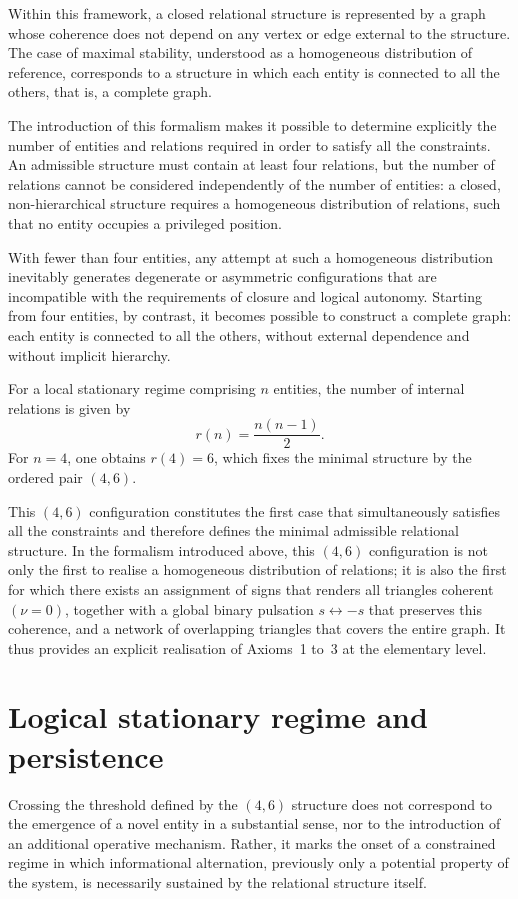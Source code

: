 \documentclass[11pt,a4paper]{article}
\begin{document}
Within this framework, a closed relational structure is represented by a graph whose coherence does not depend on any vertex or edge external to the structure. The case of maximal stability, understood as a homogeneous distribution of reference, corresponds to a structure in which each entity is connected to all the others, that is, a complete graph.

The introduction of this formalism makes it possible to determine explicitly the number of entities and relations required in order to satisfy all the constraints. An admissible structure must contain at least four relations, but the number of relations cannot be considered independently of the number of entities: a closed, non-hierarchical structure requires a homogeneous distribution of relations, such that no entity occupies a privileged position.

With fewer than four entities, any attempt at such a homogeneous distribution inevitably generates degenerate or asymmetric configurations that are incompatible with the requirements of closure and logical autonomy. Starting from four entities, by contrast, it becomes possible to construct a complete graph: each entity is connected to all the others, without external dependence and without implicit hierarchy.

For a local stationary regime comprising \(n\) entities, the number of internal relations is given by
\[
r(n) = \frac{n(n-1)}{2}.
\]
For \(n = 4\), one obtains \(r(4) = 6\), which fixes the minimal structure by the ordered pair \((4,6)\).

This \((4,6)\) configuration constitutes the first case that simultaneously satisfies all the constraints and therefore defines the minimal admissible relational structure. In the formalism introduced above, this \((4,6)\) configuration is not only the first to realise a homogeneous distribution of relations; it is also the first for which there exists an assignment of signs that renders all triangles coherent \((\nu = 0)\), together with a global binary pulsation \(s \leftrightarrow -s\) that preserves this coherence, and a network of overlapping triangles that covers the entire graph. It thus provides an explicit realisation of Axioms~1 to~3 at the elementary level.

\section{Logical stationary regime and persistence}
Crossing the threshold defined by the \((4,6)\) structure does not correspond to the emergence of a novel entity in a substantial sense, nor to the introduction of an additional operative mechanism. Rather, it marks the onset of a constrained regime in which informational alternation, previously only a potential property of the system, is necessarily sustained by the relational structure itself.
\end{document}
